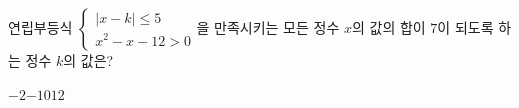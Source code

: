 연립부등식 $\begin{cases} |x-k|\le 5 \\ x^2-x-12>0 \end{cases}$을 만족시키는 모든 정수 $x$의 값의 합이 $7$이 되도록 하는 정수 $k$의 값은?
\begin{choices32}{$-2$}{$-1$}{$0$}{$1$}{$2$}\end{choices32}
